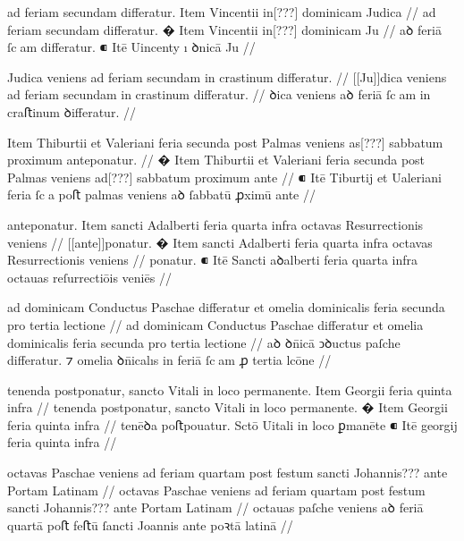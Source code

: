 \ex \bg
\gla
{}
ad feriam
secundam differatur.
{} Item Vincentii in[???] dominicam Judica
//
\glRekonstrukcja
{}
ad feriam
secundam differatur.
� Item Vincentii in[???] dominicam Ju
//
\glU
{}
aꝺ feriā ſcam differatur. ⁌ Itē Uincenty ı ꝺnicā Ju
//
\endgl
\xe


\ex \bg
\gla
{}
Judica veniens ad feriam secundam
in crastinum differatur.
//
\glRekonstrukcja
{}
[[Ju]]dica veniens ad feriam secundam
in crastinum differatur.
//
\glU
{}
ꝺica veniens aꝺ feriā ſcam in craﬅinum ꝺiﬀeratur.
//
\endgl
\xe



\ex \bg
\gla
{}
{} Item Thiburtii et Valeriani feria secunda post Palmas veniens as[???]
sabbatum proximum anteponatur.
//
\glRekonstrukcja
{}
� Item Thiburtii et Valeriani feria secunda post Palmas veniens ad[???]
sabbatum proximum ante
//
\glU
{}
⁌ Itē Tiburtij et Ualeriani feria ſca poﬅ palmas veniens aꝺ ſabbatū ꝓximū ante
//
\endgl
\xe



\ex \bg
\gla
{}
anteponatur.
{} Item sancti Adalberti feria quarta infra octavas Resurrectionis
veniens
//
\glRekonstrukcja
{}
[[ante]]ponatur.
� Item sancti Adalberti feria quarta infra octavas Resurrectionis
veniens
//
\glU
{}
ponatur. ⁌ Itē Sancti aꝺalberti feria quarta infra octauas reſurrectiōis veniēs
//
\endgl
\xe



\ex \bg
\gla
{}
ad dominicam Conductus Paschae differatur et omelia dominicalis {} feria secunda pro tertia lectione
//
\glRekonstrukcja
{}
ad dominicam Conductus Paschae differatur et omelia dominicalis {}feria secunda pro tertia lectione
//
\glU
{}
aꝺ ꝺn̄icā ↄꝺuctus paſche diﬀeratur. ⁊ omelia ꝺn̄icalıs in feriā ſcam ꝓ tertia lcōne
//
\endgl
\xe



\ex \bg
\gla
{}
tenenda postponatur, sancto Vitali
in loco permanente.
{} Item Georgii feria quinta infra
//
\glRekonstrukcja
{}
tenenda postponatur, sancto Vitali
in loco permanente.
� Item Georgii feria quinta infra
//
\glU
{}
tenēꝺa poﬅpouatur. Sctō Uitali in loco ꝑmanēte ⁌ Itē georgij feria quinta infra
//
\endgl
\xe




\ex \bg
\gla
{}
octavas Paschae veniens ad feriam
quartam post festum sancti Johannis{???} ante Portam Latinam 
//
\glRekonstrukcja
{}
octavas Paschae veniens ad feriam
quartam post festum sancti Johannis{???} ante Portam Latinam 
//
\glU
{}
octauas paſche veniens aꝺ feriā quartā poﬅ feﬅū ſancti Joannis ante poꝛtā latinā 
//
\endgl
\xe





